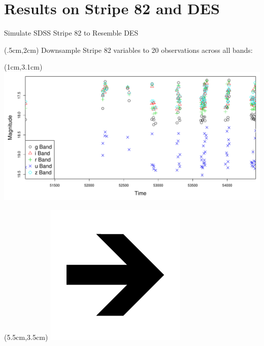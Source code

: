\documentclass[12pt]{beamer}
\begin{document}


\section{Results on Stripe 82 and DES}

\begin{frame}{Simulate SDSS Stripe 82 to Resemble DES}

  \begin{textblock*}{12cm}(.5cm,2cm) %
Downsample Stripe 82 variables to 20 observations across all bands:
\end{textblock*}

  \begin{textblock*}{3cm}(1cm,3.1cm) %
\includegraphics[scale=.15]{figs/unfolded_13350.pdf}
\end{textblock*}


  \begin{textblock*}{3cm}(5.5cm,3.5cm) %
\includegraphics[scale=.15]{figs/rightarrow.png}
\end{textblock*}


\end{frame}
\end{document}
